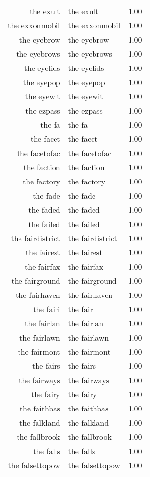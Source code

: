 \begin{table}[ht]
\begin{tabular}{rlr}
  the exult & the exult & 1.00 \\ 
  the exxonmobil & the exxonmobil & 1.00 \\ 
  the eyebrow & the eyebrow & 1.00 \\ 
  the eyebrows & the eyebrows & 1.00 \\ 
  the eyelids & the eyelids & 1.00 \\ 
  the eyepop & the eyepop & 1.00 \\ 
  the eyewit & the eyewit & 1.00 \\ 
  the ezpass & the ezpass & 1.00 \\ 
  the fa & the fa & 1.00 \\ 
  the facet & the facet & 1.00 \\ 
  the facetofac & the facetofac & 1.00 \\ 
  the faction & the faction & 1.00 \\ 
  the factory & the factory & 1.00 \\ 
  the fade & the fade & 1.00 \\ 
  the faded & the faded & 1.00 \\ 
  the failed & the failed & 1.00 \\ 
  the fairdistrict & the fairdistrict & 1.00 \\ 
  the fairest & the fairest & 1.00 \\ 
  the fairfax & the fairfax & 1.00 \\ 
  the fairground & the fairground & 1.00 \\ 
  the fairhaven & the fairhaven & 1.00 \\ 
  the fairi & the fairi & 1.00 \\ 
  the fairlan & the fairlan & 1.00 \\ 
  the fairlawn & the fairlawn & 1.00 \\ 
  the fairmont & the fairmont & 1.00 \\ 
  the fairs & the fairs & 1.00 \\ 
  the fairways & the fairways & 1.00 \\ 
  the fairy & the fairy & 1.00 \\ 
  the faithbas & the faithbas & 1.00 \\ 
  the falkland & the falkland & 1.00 \\ 
  the fallbrook & the fallbrook & 1.00 \\ 
  the falls & the falls & 1.00 \\ 
  the falsettopow & the falsettopow & 1.00 \\ 

\end{tabular}
\end{table}
